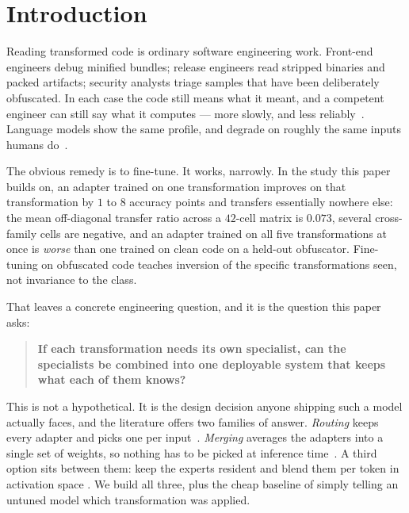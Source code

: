 \documentclass[sigconf,review,anonymous]{acmart}
\begin{document}
\section{Introduction}
\label{sec:intro}

Reading transformed code is ordinary software engineering work. Front-end engineers debug
minified bundles; release engineers read stripped binaries and packed artifacts; security
analysts triage samples that have been deliberately obfuscated. In each case the code still
means what it meant, and a competent engineer can still say what it computes --- more slowly,
and less reliably~\cite{nguyen2026obfuscation}. Language models show the same profile, and
degrade on roughly the same inputs humans do~\cite{le2026machines}.

The obvious remedy is to fine-tune. It works, narrowly. In the study this paper builds on, an
adapter trained on one transformation improves on that transformation by $1$ to $8$ accuracy
points and transfers essentially nowhere else: the mean off-diagonal transfer ratio across a
$42$-cell matrix is $0.073$, several cross-family cells are negative, and an adapter trained on
all five transformations at once is \emph{worse} than one trained on clean code on a held-out
obfuscator. Fine-tuning on obfuscated code teaches inversion of the specific transformations
seen, not invariance to the class.

That leaves a concrete engineering question, and it is the question this paper asks:

\begin{quote}
\textbf{If each transformation needs its own specialist, can the specialists be combined into
one deployable system that keeps what each of them knows?}
\end{quote}

This is not a hypothetical. It is the design decision anyone shipping such a model actually
faces, and the literature offers two families of answer. \emph{Routing} keeps every adapter and
picks one per input~\cite{pfeiffer2021adapterfusion,huang2024lorahub}. \emph{Merging} averages
the adapters into a single set of weights, so nothing has to be picked at inference
time~\cite{yadav2023ties,yu2024dare,ilharco2023task,wortsman2022soups}. A third option sits
between them: keep the experts resident and blend them per token in activation space
\cite{wu2024mole,li2024mixlora}. We build all three, plus the cheap baseline of simply telling
an untuned model which transformation was applied.
\end{document}
